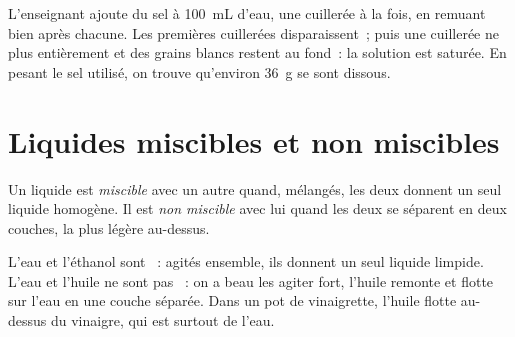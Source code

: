 \begin{inthelab}
L'enseignant ajoute du sel à \qty{100}{mL} d'eau, une cuillerée à la
fois, en remuant bien après chacune. Les premières cuillerées
disparaissent~; puis une cuillerée ne  plus entièrement et des
grains blancs restent au fond~: la solution est saturée. En pesant le
sel utilisé, on trouve qu'environ \qty{36}{g} se sont dissous.
\end{inthelab}

\section{Liquides miscibles et non miscibles}

\begin{definition}\label{def:g6:solutions-and-solubility:miscible}
Un liquide est \emph{miscible} avec un autre quand,
mélangés, les deux donnent un seul liquide homogène. Il est
\emph{non miscible} avec lui quand les deux se
séparent en deux couches, la plus légère au-dessus.
\end{definition}

\begin{example}\label{ex:g6:solutions-and-solubility:liquids}
L'eau et l'éthanol sont ~: agités ensemble, ils donnent un seul
liquide limpide. L'eau et l'huile ne sont pas ~: on a beau les
agiter fort, l'huile remonte et flotte sur l'eau en une couche séparée.
Dans un pot de vinaigrette, l'huile flotte au-dessus du vinaigre, qui
est surtout de l'eau.
\end{example}

